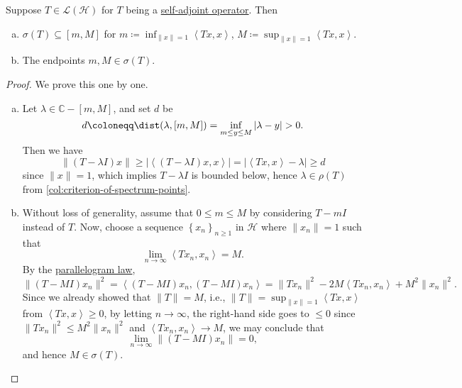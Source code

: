 \begin{theorem}\label{thm:spectrum-interval}
	Suppose \(T \in \mathcal{L} (\mathcal{H} )\) for \(T\) being a \hyperref[def:self-adjoint-op]{self-adjoint operator}. Then
	\begin{enumerate}[(a)]
		\item \(\sigma (T) \subseteq [m, M]\) for \(m\coloneqq \inf _{\lVert x \rVert = 1}\left\langle Tx, x \right\rangle \), \(M\coloneqq \sup _{\lVert x \rVert = 1} \left\langle Tx, x \right\rangle \).
		\item The endpoints \(m, M\in \sigma (T)\).
	\end{enumerate}
\end{theorem}
\begin{proof}
	We prove this one by one.
	\begin{enumerate}[(a)]
		\item Let \(\lambda \in \mathbb{C} -[m, M]\), and set \(d\) be
		      \[
			      d\coloneqq \dist(\lambda , [m, M])
			      = \inf _{m \leq y\leq M} \vert \lambda -y \vert > 0.
		      \]
		      Then we have
		      \[
			      \lVert (T-\lambda I)x \rVert
			      \geq \vert \left\langle (T-\lambda I)x, x \right\rangle  \vert
			      = \vert \left\langle Tx, x \right\rangle - \lambda  \vert
			      \geq d
		      \]
		      since \(\lVert x \rVert = 1\), which implies \(T - \lambda I\) is bounded below, hence \(\lambda \in \rho (T)\) from \autoref{col:criterion-of-spectrum-points}.
		\item Without loss of generality, assume that \(0 \leq m \leq M\) by considering \(T - mI\) instead of \(T\). Now, choose a sequence \(\left\{ x_n \right\} _{n\geq 1}\) in \(\mathcal{H} \) where \(\lVert x_n \rVert = 1\) such that
		      \[
			      \lim_{n \to \infty} \left\langle Tx_n, x_n \right\rangle = M.
		      \]
		      By the \hyperref[lma:parallelogram-law]{parallelogram law},
		      \[
			      \lVert (T-MI)x_n \rVert ^{2}
			      = \left\langle (T-MI)x_n, (T-MI)x_n \right\rangle
			      = \lVert Tx_n \rVert ^2 - 2M\left\langle Tx_n, x_n \right\rangle + M^{2} \lVert x_n \rVert ^{2}.
		      \]
		      Since we already showed that \(\lVert T \rVert = M\), i.e., \(\lVert T \rVert = \sup _{\lVert x \rVert = 1}\left\langle Tx, x \right\rangle \) from \(\left\langle Tx, x \right\rangle \geq 0\), by letting \(n \to \infty \), the right-hand side goes to \(\leq 0\) since \(\lVert Tx_n \rVert ^{2} \leq M^{2} \lVert x_n \rVert ^{2} \) and \(\left\langle Tx_n, x_n \right\rangle \to M\), we may conclude that
		      \[
			      \lim_{n \to \infty} \lVert (T-MI)x_n \rVert = 0,
		      \]
		      and hence \(M\in \sigma (T)\).
	\end{enumerate}
\end{proof}

